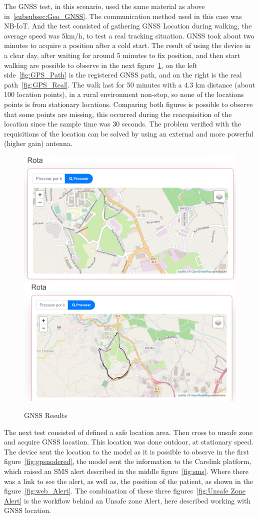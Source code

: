 The GNSS test, in this scenario, used the same material as above in~\ref{subsubsec:Geo_GNSS}. The communication method used in this case was NB-IoT. And the test consisted of gathering GNSS Location during walking, the average speed was 5km/h, to test a real tracking situation. GNSS took about two minutes to acquire a position after a cold start.
The result of using the device in a clear day, after waiting for around 5 minutes to fix position, and then start walking are possible to observe in the next figure~\ref{fig:GNSS_Results}, on the left side~\ref{fig:GPS_Path} is the registered GNSS path, and on the right is the real path~\ref{fig:GPS_Real}.  The walk last for 50 minutes with a 4.3 km distance (about 100 location points), in a rural environment non-stop, so none of the locations points is from stationary locations. Comparing both figures is possible to observe that some points are missing, this occurred during the reacquisition of the location since the sample time was 30 seconds. The problem verified with the requisitions of the location can be solved by using an external and more powerful (higher gain) antenna.
\begin{figure}[htbp]
  \centering
    {\includegraphics[width=0.5\linewidth]{Chapters/Figures/GPS.JPG}}%
    {\includegraphics[width=0.5\linewidth]{Chapters/Figures/GPSREAL.JPG}}%
  \caption{GNSS Results}
  \label{fig:GNSS_Results}
\end{figure}

The next test consisted of defined a safe location area. Then cross to unsafe zone and acquire GNSS location. This location was done outdoor, at stationary speed. The device sent the location to the model as it is possible to observe in the first figure~\ref{fig:gpsnodered}, the model sent the information to the Carelink platform, which raised an SMS alert described in the middle figure~\ref{fig:sms}. Where there was a link to see the alert, as well as, the position of the patient, as shown in the figure~\ref{fig:web_Alert}. The combination of these three figures~\ref{fig:Unsafe Zone Alert} is the workflow behind an Unsafe zone Alert, here described working with GNSS location.\newline\newline

